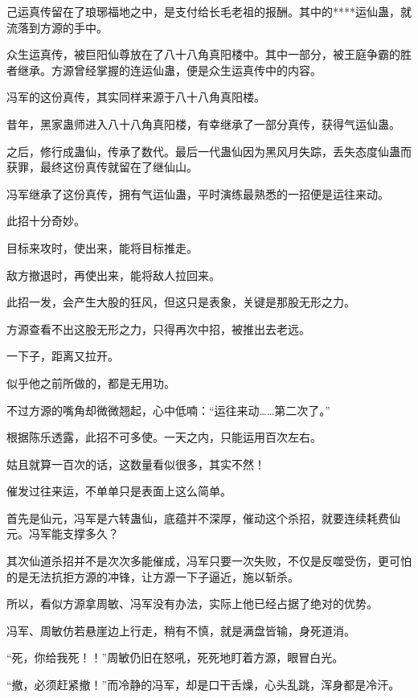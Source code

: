 \begin{this_body}
己运真传留在了琅琊福地之中，是支付给长毛老祖的报酬。其中的****运仙蛊，就流落到方源的手中。

众生运真传，被巨阳仙尊放在了八十八角真阳楼中。其中一部分，被王庭争霸的胜者继承。方源曾经掌握的连运仙蛊，便是众生运真传中的内容。

冯军的这份真传，其实同样来源于八十八角真阳楼。

昔年，黑家蛊师进入八十八角真阳楼，有幸继承了一部分真传，获得气运仙蛊。

之后，修行成蛊仙，传承了数代。最后一代蛊仙因为黑风月失踪，丢失态度仙蛊而获罪，最终这份真传就留在了继仙山。

冯军继承了这份真传，拥有气运仙蛊，平时演练最熟悉的一招便是运往来动。

此招十分奇妙。

目标来攻时，使出来，能将目标推走。

敌方撤退时，再使出来，能将敌人拉回来。

此招一发，会产生大股的狂风，但这只是表象，关键是那股无形之力。

方源查看不出这股无形之力，只得再次中招，被推出去老远。

一下子，距离又拉开。

似乎他之前所做的，都是无用功。

不过方源的嘴角却微微翘起，心中低喃：“运往来动……第二次了。”

根据陈乐透露，此招不可多使。一天之内，只能运用百次左右。

姑且就算一百次的话，这数量看似很多，其实不然！

催发过往来运，不单单只是表面上这么简单。

首先是仙元，冯军是六转蛊仙，底蕴并不深厚，催动这个杀招，就要连续耗费仙元。冯军能支撑多久？

其次仙道杀招并不是次次多能催成，冯军只要一次失败，不仅是反噬受伤，更可怕的是无法抗拒方源的冲锋，让方源一下子逼近，施以斩杀。

所以，看似方源拿周敏、冯军没有办法，实际上他已经占据了绝对的优势。

冯军、周敏仿若悬崖边上行走，稍有不慎，就是满盘皆输，身死道消。

“死，你给我死！！”周敏仍旧在怒吼，死死地盯着方源，眼冒白光。

“撤，必须赶紧撤！”而冷静的冯军，却是口干舌燥，心头乱跳，浑身都是冷汗。

\end{this_body}

